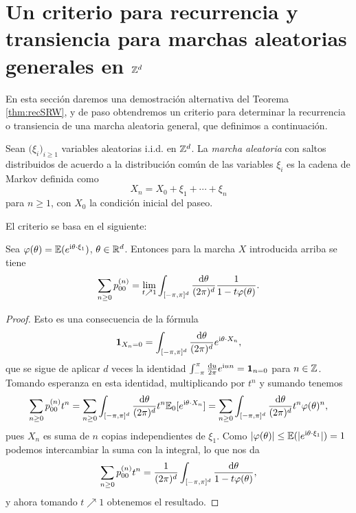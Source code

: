 
\section{Un criterio para recurrencia y transiencia para marchas aleatorias generales en $\mathbb{Z}^d$}\label{sec:rectranssrwgen}

En esta sección daremos una demostración alternativa del Teorema \ref{thm:recSRW}, y de paso obtendremos un criterio para determinar la recurrencia o transiencia de una marcha aleatoria general, que definimos a continuación.

\begin{defn}
Sean $\big(\xi_i\big)_{i\geq1}$ variables aleatorias i.i.d. en $\mathbb{Z}^d$.
La \emph{marcha aleatoria} con saltos distribuidos de acuerdo a la distribución común de las variables $\xi_i$ es la cadena de Markov definida como
\[X_n=X_0+\xi_1+\dotsm+\xi_n\]
para $n\geq1$, con $X_0$ la condición inicial del paseo.
\end{defn}

El criterio se basa en el siguiente:

\begin{lem}
Sea $\varphi(\theta)=\mathbb{E}(e^{{\rm i} \theta\cdot \xi_1})$, $\theta\in\mathbb{R}^d$. 
Entonces para la marcha $X$ introducida arriba se tiene
\[\sum_{n\geq0}p_{00}^{(n)}=\lim_{t\nearrow1}\int_{[-\pi,\pi]^d}\frac{\mathrm{d}\theta}{(2 \pi)^d}\frac1{1-t\varphi(\theta)}.\]
\end{lem}

\begin{proof}
Esto es una consecuencia de la fórmula
\[\mathbf{1}_{X_n=0}=\int_{[-\pi,\pi]^d}\frac{\mathrm{d}\theta}{(2 \pi)^d}e^{{\rm i} \theta\cdot X_n},\]
que se sigue de aplicar $d$ veces la identidad $\int_{-\pi}^{\pi}\frac{\mathrm{d} u}{2 \pi}e^{{\rm i} u n}=\mathbf{1}_{n=0}$ para $n\in\mathbb{Z}$.
Tomando esperanza en esta identidad, multiplicando por $t^n$ y sumando tenemos
\[\sum_{n\geq0}p_{00}^{(n)}t^n=\sum_{n\geq0}\int_{[-\pi,\pi]^d}\frac{\mathrm{d} \theta}{(2 \pi)^d}t^n\mathbb{E}_0[e^{{\rm i} \theta\cdot X_n}]=\sum_{n\geq0}\int_{[-\pi,\pi]^d}\frac{\mathrm{d}\theta}{(2 \pi)^d}t^n\varphi(\theta)^n,\]
pues $X_n$ es suma de $n$ copias independientes de $\xi_1$.
Como $|\varphi(\theta)|\leq\mathbb{E}(|e^{{\rm i} \theta\cdot \xi_1}|)=1$ podemos intercambiar la suma con la integral, lo que nos da
\[\sum_{n\geq0}p_{00}^{(n)}t^n=\frac{1}{(2 \pi)^d}\int_{[-\pi,\pi]^d}\frac{\mathrm{d}\theta}{1-t\varphi(\theta)},\]
y ahora tomando $t\nearrow1$ obtenemos el resultado.
\end{proof}

